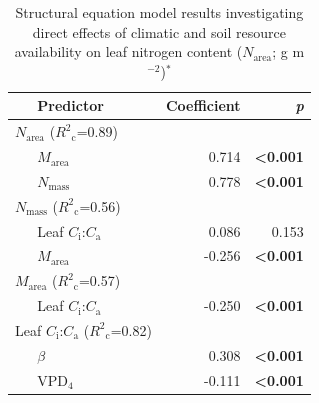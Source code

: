 \newpage
\begin{table}
    \centering
    \caption[Structural equation model results investigating direct effects of climatic and soil resource availability on leaf nitrogen content]{Structural equation model results investigating direct effects of climatic and soil resource availability on leaf nitrogen content ($N_\mathrm{area}$; g m$^{-2}$)$^*$}
        \begin{tabular}{p{0.5cm}p{3cm}p{1.5cm}p{1.5cm}}
            \hline
            & Predictor & \multicolumn{1}{r}{Coefficient} & \multicolumn{1}{r}{\textit{p}} \\
            \hline

            \multicolumn{2}{l}{$N_\mathrm{area}$ ($R^2{}_\mathrm{c}$=0.89)} && \\
            & \multicolumn{1}{l}{$M_\mathrm{area}$} & \multicolumn{1}{r}{0.714} & \multicolumn{1}{r}{\textbf{<0.001}} \\
            & \multicolumn{1}{l}{$N_\mathrm{mass}$} & \multicolumn{1}{r}{0.778} & \multicolumn{1}{r}{\textbf{<0.001}} \\
            \hline

            \multicolumn{2}{l}{$N_\mathrm{mass}$ ($R^2{}_\mathrm{c}$=0.56)} && \\
            & \multicolumn{1}{l}{Leaf $C_\mathrm{i}$:$C_\mathrm{a}$} & \multicolumn{1}{r}{0.086} & \multicolumn{1}{r}{0.153} \\
            & \multicolumn{1}{l}{$M_\mathrm{area}$} & \multicolumn{1}{r}{-0.256} & \multicolumn{1}{r}{\textbf{<0.001}} \\
            \hline

            \multicolumn{2}{l}{$M_\mathrm{area}$ ($R^2{}_\mathrm{c}$=0.57)} && \\
            & \multicolumn{1}{l}{Leaf $C_\mathrm{i}$:$C_\mathrm{a}$} & \multicolumn{1}{r}{-0.250} & \multicolumn{1}{r}{\textbf{<0.001}} \\
            \hline

            \multicolumn{2}{l}{Leaf $C_\mathrm{i}$:$C_\mathrm{a}$ ($R^2{}_\mathrm{c}$=0.82)} && \\
            & \multicolumn{1}{l}{$\beta$} & \multicolumn{1}{r}{0.308} & \multicolumn{1}{r}{\textbf{<0.001}} \\
            & \multicolumn{1}{l}{VPD$_4$} & \multicolumn{1}{r}{-0.111} & \multicolumn{1}{r}{\textbf{<0.001}} \\
            \hline


\end{tabular}
\end{table}
